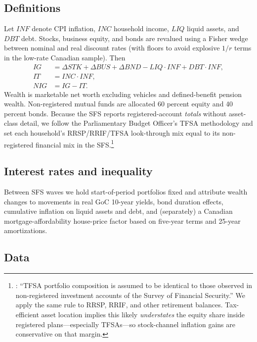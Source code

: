 \documentclass[11pt]{article}
\begin{document}
\subsection{Definitions \citep{wolff2023inflationtax}}

Let $INF$ denote CPI inflation, $INC$ household income, $LIQ$ liquid assets, and $DBT$ debt. Stocks, business equity, and bonds are revalued using a Fisher wedge between nominal and real discount rates (with floors to avoid explosive $1/r$ terms in the low-rate Canadian sample). Then
\begin{align}
IG &= \Delta STK + \Delta BUS + \Delta BND - LIQ\cdot INF + DBT\cdot INF,\\
IT &= INC\cdot INF,\\
NIG &= IG - IT.
\end{align}
Wealth is marketable net worth excluding vehicles and defined-benefit pension wealth. Non-registered mutual funds are allocated 60 percent equity and 40 percent bonds. Because the SFS reports registered-account \emph{totals} without asset-class detail, we follow the Parliamentary Budget Officer's TFSA methodology and set each household's RRSP/RRIF/TFSA look-through mix equal to its non-registered financial mix in the SFS.\footnote{\citet{pbo2015tfsa}: ``TFSA portfolio composition is assumed to be identical to those observed in non-registered investment accounts of the Survey of Financial Security.'' We apply the same rule to RRSP, RRIF, and other retirement balances. Tax-efficient asset location implies this likely \emph{understates} the equity share inside registered plans---especially TFSAs---so stock-channel inflation gains are conservative on that margin.}

\subsection{Interest rates and inequality \citep{wolff2021inflation}}

Between SFS waves we hold start-of-period portfolios fixed and attribute wealth changes to movements in real GoC 10-year yields, bond duration effects, cumulative inflation on liquid assets and debt, and (separately) a Canadian mortgage-affordability house-price factor based on five-year terms and 25-year amortizations.

\subsection{Data}
\end{document}
